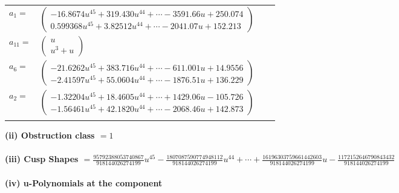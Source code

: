 \documentclass[1p]{elsarticle_modified}
\theoremstyle{definition}
\begin{document}
\begin{tabular}{m{7pt} m{180pt} m{7pt} m{180pt} }
\flushright $a_{1}=$&$\begin{pmatrix}-16.8674 u^{45}+319.430 u^{44}+\cdots-3591.66 u+250.074\\0.599368 u^{45}+3.82512 u^{44}+\cdots-2041.07 u+152.213\end{pmatrix}$ \\
\flushright $a_{11}=$&$\begin{pmatrix}u\\u^3+u\end{pmatrix}$ \\
\flushright $a_{6}=$&$\begin{pmatrix}-21.6262 u^{45}+383.716 u^{44}+\cdots-611.001 u+14.9556\\-2.41597 u^{45}+55.0604 u^{44}+\cdots-1876.51 u+136.229\end{pmatrix}$ \\
\flushright $a_{2}=$&$\begin{pmatrix}-1.32204 u^{45}+18.4605 u^{44}+\cdots+1429.06 u-105.726\\-1.56461 u^{45}+42.1820 u^{44}+\cdots-2068.46 u+142.873\end{pmatrix}$\\&\end{tabular}
\flushleft \textbf{(ii) Obstruction class $= 1$}\\~\\
\flushleft \textbf{(iii) Cusp Shapes $= \frac{95792388053740867}{918144026274199} u^{45}-\frac{1807087590774948112}{918144026274199} u^{44}+\cdots+\frac{16196303759661442603}{918144026274199} u-\frac{1172152646790843432}{918144026274199}$}\\~\\
\newpage\renewcommand{\arraystretch}{1}
\flushleft \textbf{(iv) u-Polynomials at the component}\newline \\
\end{document}
